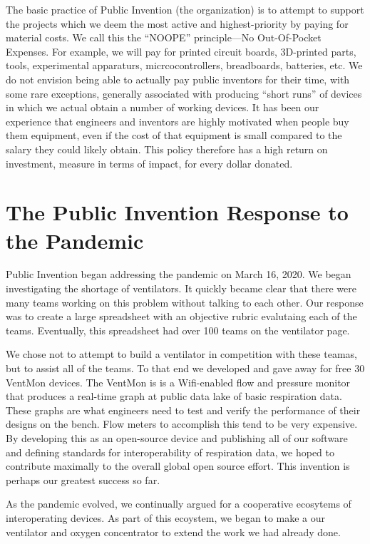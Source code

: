 \documentclass[
	fontsize=10pt, %
	twoside=false, %
	secnumdepth=1, %
]{kaobook}
\begin{document}
The basic practice of Public Invention (the organization) is to attempt to
support the projects which we deem the most active and highest-priority
by paying for material costs.
We call this the ``NOOPE'' principle---No Out-Of-Pocket Expenses.
For example, we will pay for printed circuit boards, 3D-printed parts, tools,
experimental apparaturs, micrcocontrollers, breadboards, batteries, etc.
We do not envision being able to actually pay public inventors for their
time, with some rare exceptions, generally associated with producing
``short runs'' of devices in which we actual obtain a number of working devices.
It has been our experience that engineers and inventors are highly motivated when people
buy them equipment, even if the cost of that equipment is small compared to the
salary they could likely obtain.
This policy therefore has a high return on investment, measure in terms of impact,
for every dollar donated.

\chapter{The Public Invention Response to the Pandemic}

Public Invention began addressing the pandemic on March 16, 2020.
We began investigating the shortage of ventilators.
It quickly became clear that there were many teams working on this
problem without talking to each other.
Our response was to create a large spreadsheet with an objective
rubric evalutaing each of the teams.
Eventually, this spreadsheet had over 100 teams on the ventilator
page.

We chose not to attempt to build a ventilator in competition with
these teamas, but to assist all of the teams.
To that end we developed and gave away for free 30 VentMon devices.
The VentMon is is a Wifi-enabled flow and pressure monitor that
produces a real-time graph at public data lake of basic respiration
data.
These graphs are what engineers need to test and verify the performance
of their designs on the bench.
Flow meters to accomplish this tend to be very expensive.
By developing this as an open-source device and publishing all of our
software and defining standards for interoperability of respiration
data, we hoped to contribute maximally to the overall global
open source effort. This invention is perhaps our greatest success
so far.

As the pandemic evolved, we continually argued for a cooperative
ecosytems of interoperating devices.
As part of this ecoystem, we began to make a our ventilator
and oxygen concentrator to extend the work we had already done.
\end{document}
